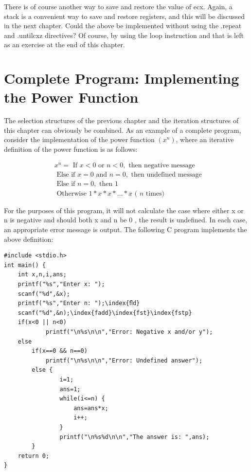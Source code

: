 \documentclass[10pt]{book}
\begin{document}
There is of course another way to save and restore the value of ecx. Again, a stack is a convenient way to save and restore registers, and this will be discussed in the next chapter. Could the above be implemented without using the .repeat and .untilcxz directives? Of course, by using the loop instruction and that is left as an exercise at the end of this chapter.

\section{Complete Program: Implementing the Power Function}
The selection structures of the previous chapter and the iteration structures of this chapter can obviously be combined. As an example of a complete program, consider the implementation of the power function $\left(x^{n}\right)$, where an iterative definition of the power function is as follows:

$$
\begin{aligned}
& x^{n}=\text { If } x<0 \text { or } n<0, \text { then negative message } \\
& \text { Else if } x=0 \text { and } n=0, \text { then undefined message } \\
& \text { Else if } n=0, \text { then } 1 \\
& \text { Otherwise } 1 * x * x * \ldots * x \text { ( } n \text { times) }
\end{aligned}
$$

For the purposes of this program, it will not calculate the case where either x or n is negative and should both x and n be 0 , the result is undefined. In each case, an appropriate error message is output. The following C program implements the above definition:


\begin{verbatim}
#include <stdio.h>
int main() {
    int x,n,i,ans;
    printf("%s","Enter x: ");
    scanf("%d",&x);
    printf("%s","Enter n: ");\index{ﬂd}
    scanf("%d",&n);\index{fadd}\index{fst}\index{fstp}
    if(x<0 || n<0)
            printf("\n%s\n\n","Error: Negative x and/or y");
    else
        if(x==0 && n==0)
            printf("\n%s\n\n","Error: Undefined answer");
        else {
                i=1;
                ans=1;
                while(i<=n) {
                    ans=ans*x;
                    i++;
                }
                printf("\n%s%d\n\n","The answer is: ",ans);
        }
    return 0;
}
\end{verbatim}
\end{document}
